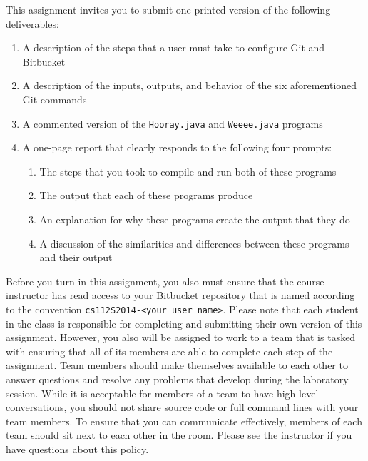   This assignment invites you to submit one printed version of the following deliverables:

  \vspace*{-.05in}
  \begin{enumerate}
	
    \item A description of the steps that a user must take to configure Git and Bitbucket

    \item A description of the inputs, outputs, and behavior of the six aforementioned Git commands

    \item A commented version of the {\tt Hooray.java} and {\tt Weeee.java} programs
	
    \item A one-page report that clearly responds to the following four prompts:
  
      \vspace*{-.05in}
      \begin{enumerate}

	\item The steps that you took to compile and run both of these programs

	\item The output that each of these programs produce

	\item An explanation for why these programs create the output that they do

	\item A discussion of the similarities and differences between these programs and their output

      \end{enumerate}

  \end{enumerate}

Before you turn in this assignment, you also must ensure that the course instructor has read access to your Bitbucket
repository that is named according to the convention {\tt cs112S2014-<your user name>}. Please note that each student in
the class is responsible for completing and submitting their own version of this assignment.  However, you also will be
assigned to work to a team that is tasked with ensuring that all of its members are able to complete each step of the
assignment.  Team members should make themselves available to each other to answer questions and resolve any problems
that develop during the laboratory session. While it is acceptable for members of a team to have high-level
conversations, you should not share source code or full command lines with your team members. To ensure that you can
communicate effectively, members of each team should sit next to each other in the room.  Please see the instructor if
you have questions about this policy.




